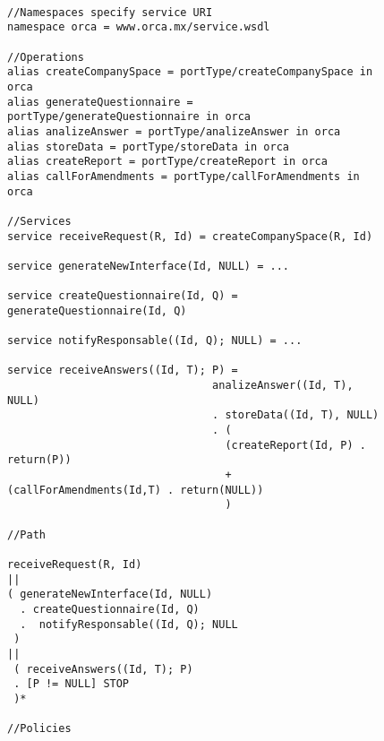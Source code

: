 \begin{figure}[ht!]
\tiny
\centering

\begin{lstlisting}[label=list:flyingPigPiPEWS,caption=pi-PEWS
Specification: FlyingPig. ]

//Namespaces specify service URI
namespace orca = www.orca.mx/service.wsdl

//Operations
alias createCompanySpace = portType/createCompanySpace in orca
alias generateQuestionnaire = portType/generateQuestionnaire in orca
alias analizeAnswer = portType/analizeAnswer in orca
alias storeData = portType/storeData in orca
alias createReport = portType/createReport in orca
alias callForAmendments = portType/callForAmendments in orca

//Services
service receiveRequest(R, Id) = createCompanySpace(R, Id)

service generateNewInterface(Id, NULL) = ...

service createQuestionnaire(Id, Q) = generateQuestionnaire(Id, Q)

service notifyResponsable((Id, Q); NULL) = ...

service receiveAnswers((Id, T); P) =
								analizeAnswer((Id, T), NULL) 
								. storeData((Id, T), NULL)
								. (
								  (createReport(Id, P) . return(P))
								  + (callForAmendments(Id,T) . return(NULL))
								  )
								  
//Path

receiveRequest(R, Id)
||
( generateNewInterface(Id, NULL)
  . createQuestionnaire(Id, Q)
  .  notifyResponsable((Id, Q); NULL
 )
||
 ( receiveAnswers((Id, T); P)
 . [P != NULL] STOP
 )*	
 
//Policies 					  


\end{lstlisting}
\label{fig:crimeInformationPEWS}  
\end{figure}  
